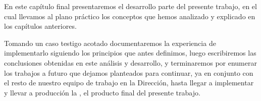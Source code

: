En este capítulo final presentaremos el desarrollo parte del presente trabajo, en el cual llevamos al plano práctico los conceptos que hemos analizado y explicado en los capítulos anteriores.

Tomando un caso testigo acotado documentaremos la experiencia de implementarlo siguiendo los principios que antes definimos, luego escribiremos las conclusiones obtenidas en este análisis y desarrollo, y terminaremos por enumerar los trabajos a futuro que dejamos planteados para continuar, ya en conjunto con el resto de nuestro equipo de trabajo en la Dirección, hasta llegar a implementar y llevar a producción la \cloud, el producto final del presente trabajo.
